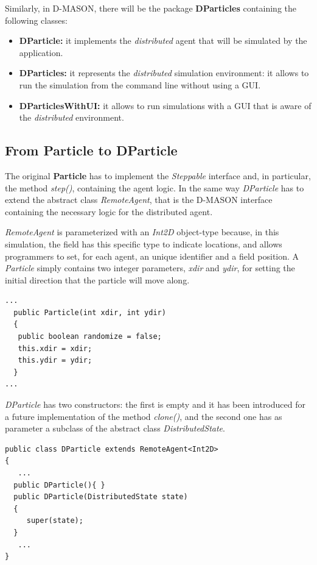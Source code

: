 \documentclass[12pt]{article}
\begin{document}
Similarly, in D-MASON, there will be the package \textbf{DParticles} containing the following classes:

\begin{itemize}
	\item \textbf{DParticle:} it implements the \textit{distributed} agent that will be simulated by the application.
	\item \textbf{DParticles:} it represents the \textit{distributed} simulation environment: it allows to run the simulation from the command line without using a GUI.
	\item \textbf{DParticlesWithUI:} it allows to run simulations with a GUI that is aware of the \textit{distributed} environment.
\end{itemize}

\subsection{From Particle to DParticle}
The original \textbf{Particle} has to implement the \textit{Steppable} interface and, in particular, the method \textit{step()}, containing the agent logic. In the same way \textit{DParticle} has to extend the abstract class \textit{RemoteAgent}, that is the D-MASON interface containing the necessary logic for the distributed agent. 

\textit{RemoteAgent} is parameterized with an \textit{Int2D} object-type because, in this simulation, the field has this specific type to indicate locations, and allows programmers to set, for each agent, an unique identifier and a field position.
A \textit{Particle} simply contains two integer parameters, \textit{xdir} and \textit{ydir}, for setting the initial direction that the particle will move along.

\begin{lstlisting}
...
  public Particle(int xdir, int ydir)
  {
   public boolean randomize = false;
   this.xdir = xdir;
   this.ydir = ydir;
  }
...
\end{lstlisting}

\textit{DParticle} has two constructors: the first is empty and it has been introduced for a future implementation of the method \textit{clone()}, and the second one has as parameter a subclass of the abstract class \textit{DistributedState}.

\begin{lstlisting}
public class DParticle extends RemoteAgent<Int2D>
{
   ...
  public DParticle(){ }
  public DParticle(DistributedState state)
  {
     super(state);
  }
   ...
}
\end{lstlisting}
\end{document}
